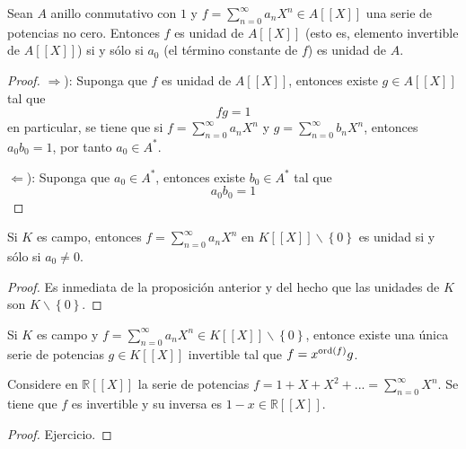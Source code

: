\documentclass[12pt]{report}
\theoremstyle{largebreak}
\newcommand{\ord}[1]{\ensuremath{\textup{ord}\left(#1\right)}}
\begin{document}
    \begin{propo}
        Sean $A$ anillo conmutativo con $1$ y $f=\sum_{ n=0}^\infty a_nX^n\in A[[X]]$ una serie de potencias no cero. Entonces $f$ es unidad de $A[[X]]$ (esto es, elemento invertible de $A[[X]]$) si y sólo si $a_0$ (el término constante de $f$) es unidad de $A$.
    \end{propo}

    \begin{proof}
        $\Rightarrow$): Suponga que $f$ es unidad de $A[[X]]$, entonces existe $g\in A[[X]]$ tal que
        \begin{equation*}
            fg=1
        \end{equation*}
        en particular, se tiene que si $f=\sum_{ n=0}^{\infty}a_nX^n$ y $g=\sum_{ n=0}^{\infty}b_nX^n$, entonces $a_0b_0=1$, por tanto $a_0\in A^*$.

        $\Leftarrow$): Suponga que $a_0\in A^*$, entonces existe $b_0\in A^*$ tal que
        \begin{equation*}
            a_0b_0=1
        \end{equation*}
    \end{proof}

    \begin{cor}
        Si $K$ es campo, entonces $f=\sum_{ n=0}^\infty a_nX^n$ en $K[[X]]\backslash\left\{0\right\}$ es unidad si y sólo si $a_0\neq0$.
    \end{cor}

    \begin{proof}
        Es inmediata de la proposición anterior y del hecho que las unidades de $K$ son $K\backslash\left\{0\right\}$.
    \end{proof}

    \begin{cor}
        Si $K$ es campo y $f=\sum_{ n=0}^\infty a_nX^n\in K[[X]]\backslash\left\{0\right\}$, entonce existe una única serie de potencias $g\in K[[X]]$ invertible tal que $f=x^{\ord{f}}g$.
    \end{cor}

    \begin{exa}
        Considere en $\mathbb{R}[[X]]$ la serie de potencias $f=1+X+X^2+...=\sum_{ n=0}^\infty X^n$. Se tiene que $f$ es invertible y su inversa es $1-x\in\mathbb{R}[[X]]$.
    \end{exa}

    \begin{proof}
        Ejercicio.
    \end{proof}
\end{document}
